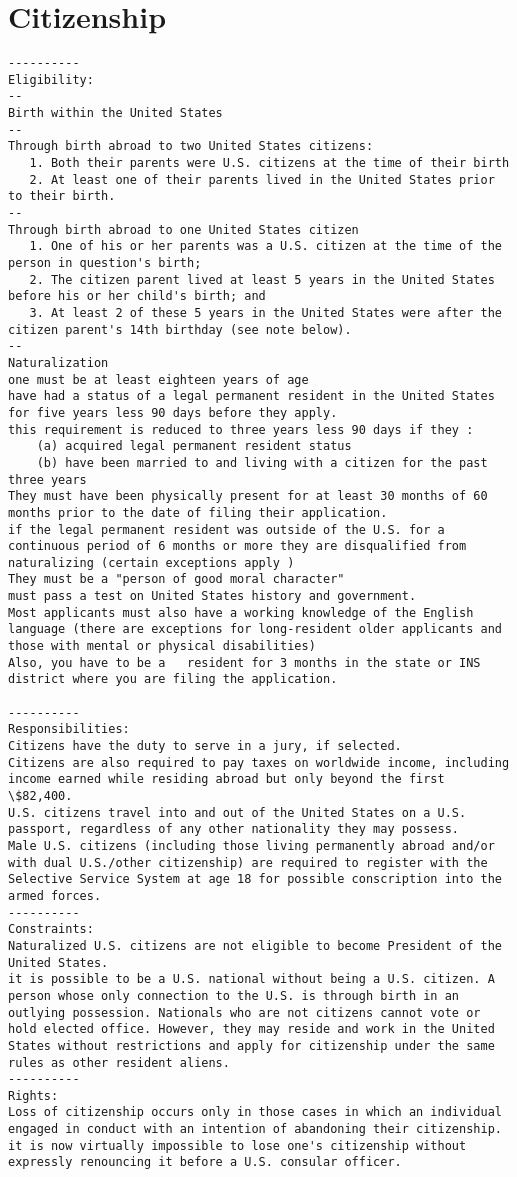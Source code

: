 \documentclass[oneside, article]{memoir}
\begin{document}
\section{Citizenship}
\begin{verbatim}
----------
Eligibility:
--
Birth within the United States
--
Through birth abroad to two United States citizens:
   1. Both their parents were U.S. citizens at the time of their birth
   2. At least one of their parents lived in the United States prior to their birth.
--
Through birth abroad to one United States citizen
   1. One of his or her parents was a U.S. citizen at the time of the person in question's birth;
   2. The citizen parent lived at least 5 years in the United States before his or her child's birth; and
   3. At least 2 of these 5 years in the United States were after the citizen parent's 14th birthday (see note below).
--
Naturalization
one must be at least eighteen years of age
have had a status of a legal permanent resident in the United States for five years less 90 days before they apply.
this requirement is reduced to three years less 90 days if they :
    (a) acquired legal permanent resident status
    (b) have been married to and living with a citizen for the past three years
They must have been physically present for at least 30 months of 60 months prior to the date of filing their application.
if the legal permanent resident was outside of the U.S. for a continuous period of 6 months or more they are disqualified from naturalizing (certain exceptions apply )
They must be a "person of good moral character"
must pass a test on United States history and government.
Most applicants must also have a working knowledge of the English language (there are exceptions for long-resident older applicants and those with mental or physical disabilities)
Also, you have to be a   resident for 3 months in the state or INS district where you are filing the application.

----------
Responsibilities:
Citizens have the duty to serve in a jury, if selected.
Citizens are also required to pay taxes on worldwide income, including income earned while residing abroad but only beyond the first \$82,400.
U.S. citizens travel into and out of the United States on a U.S. passport, regardless of any other nationality they may possess.
Male U.S. citizens (including those living permanently abroad and/or with dual U.S./other citizenship) are required to register with the Selective Service System at age 18 for possible conscription into the armed forces.
----------
Constraints:
Naturalized U.S. citizens are not eligible to become President of the United States.
it is possible to be a U.S. national without being a U.S. citizen. A person whose only connection to the U.S. is through birth in an outlying possession. Nationals who are not citizens cannot vote or hold elected office. However, they may reside and work in the United States without restrictions and apply for citizenship under the same rules as other resident aliens.
----------
Rights:
Loss of citizenship occurs only in those cases in which an individual engaged in conduct with an intention of abandoning their citizenship. it is now virtually impossible to lose one's citizenship without expressly renouncing it before a U.S. consular officer.
\end{verbatim}
\end{document}
